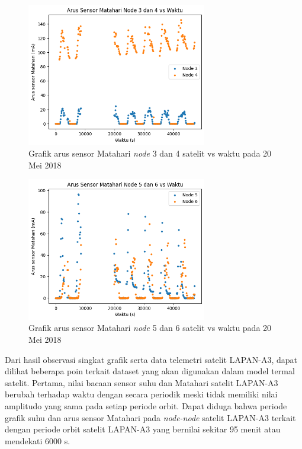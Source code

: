 \begin{figure}[H]
\setlength{}
\begin{center}
\includegraphics[width=0.7\textwidth]{fig/raw_node34_css_2018-05-20.png}
	\caption{Grafik arus sensor Matahari \textit{node} 3 dan 4 satelit vs waktu pada 20 Mei 2018}
\label{fig:rawcss3420}
\end{center}
\end{figure}

\begin{figure}[H]
\setlength{}
\begin{center}
\includegraphics[width=0.7\textwidth]{fig/raw_node56_css_2018-05-20.png}
	\caption{Grafik arus sensor Matahari \textit{node} 5 dan 6 satelit vs waktu pada 20 Mei 2018}
\label{fig:rawcss5620}
\end{center}
\end{figure}

Dari hasil observasi singkat grafik serta data telemetri satelit LAPAN-A3, dapat
dilihat beberapa poin terkait dataset yang akan digunakan dalam model termal
satelit. Pertama, nilai bacaan sensor suhu dan Matahari satelit LAPAN-A3
berubah terhadap waktu dengan secara periodik meski tidak memiliki nilai
amplitudo yang sama pada setiap periode orbit. Dapat diduga bahwa periode
grafik suhu dan arus sensor Matahari pada \textit{node-node} satelit LAPAN-A3
terkait dengan periode orbit satelit LAPAN-A3 yang bernilai sekitar 95 menit
atau mendekati 6000 s.

